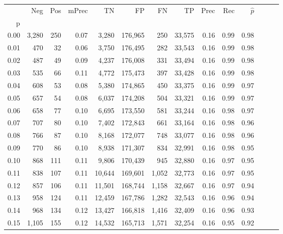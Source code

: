 \begin{tabular}{rrrrrrrrrrrrrr}
\toprule
{} &    Neg &  Pos & mPrec &       TN &       FP &      FN &      TP &  Prec &   Rec & $\hat{p}$ \\
p    &        &      &       &          &          &         &         &       &       &           \\
\midrule
0.00 &  3,280 &  250 &  0.07 &    3,280 &  176,965 &     250 &  33,575 &  0.16 &  0.99 &      0.98 \\
0.01 &    470 &   32 &  0.06 &    3,750 &  176,495 &     282 &  33,543 &  0.16 &  0.99 &      0.98 \\
0.02 &    487 &   49 &  0.09 &    4,237 &  176,008 &     331 &  33,494 &  0.16 &  0.99 &      0.98 \\
0.03 &    535 &   66 &  0.11 &    4,772 &  175,473 &     397 &  33,428 &  0.16 &  0.99 &      0.98 \\
0.04 &    608 &   53 &  0.08 &    5,380 &  174,865 &     450 &  33,375 &  0.16 &  0.99 &      0.97 \\
0.05 &    657 &   54 &  0.08 &    6,037 &  174,208 &     504 &  33,321 &  0.16 &  0.99 &      0.97 \\
0.06 &    658 &   77 &  0.10 &    6,695 &  173,550 &     581 &  33,244 &  0.16 &  0.98 &      0.97 \\
0.07 &    707 &   80 &  0.10 &    7,402 &  172,843 &     661 &  33,164 &  0.16 &  0.98 &      0.96 \\
0.08 &    766 &   87 &  0.10 &    8,168 &  172,077 &     748 &  33,077 &  0.16 &  0.98 &      0.96 \\
0.09 &    770 &   86 &  0.10 &    8,938 &  171,307 &     834 &  32,991 &  0.16 &  0.98 &      0.95 \\
0.10 &    868 &  111 &  0.11 &    9,806 &  170,439 &     945 &  32,880 &  0.16 &  0.97 &      0.95 \\
0.11 &    838 &  107 &  0.11 &   10,644 &  169,601 &   1,052 &  32,773 &  0.16 &  0.97 &      0.95 \\
0.12 &    857 &  106 &  0.11 &   11,501 &  168,744 &   1,158 &  32,667 &  0.16 &  0.97 &      0.94 \\
0.13 &    958 &  124 &  0.11 &   12,459 &  167,786 &   1,282 &  32,543 &  0.16 &  0.96 &      0.94 \\
0.14 &    968 &  134 &  0.12 &   13,427 &  166,818 &   1,416 &  32,409 &  0.16 &  0.96 &      0.93 \\
0.15 &  1,105 &  155 &  0.12 &   14,532 &  165,713 &   1,571 &  32,254 &  0.16 &  0.95 &      0.92 \\

\end{tabular}
